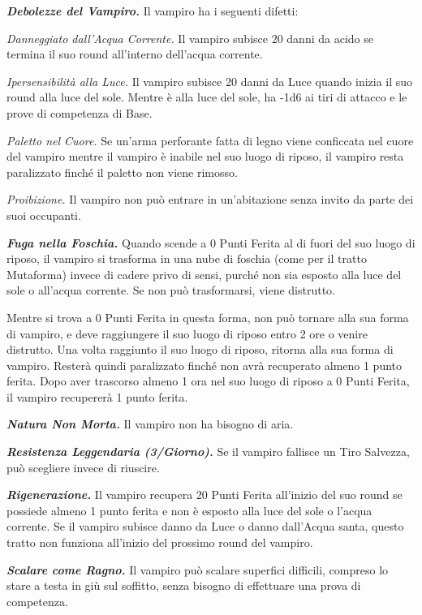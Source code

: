 \begin{multicols}{2}
{\emph{\textbf{Debolezze del Vampiro.}} Il vampiro ha i seguenti difetti:

\emph{Danneggiato dall'Acqua Corrente.} Il vampiro subisce 20 danni da acido se termina il suo round all'interno dell'acqua corrente.

\emph{Ipersensibilità alla Luce.} Il vampiro subisce 20 danni da Luce quando inizia il suo round alla luce del sole. Mentre è alla luce del sole, ha -1d6 ai tiri di attacco e le prove di competenza di Base.

\emph{Paletto nel Cuore.} Se un'arma perforante fatta di legno viene conficcata nel cuore del vampiro mentre il vampiro è inabile nel suo luogo di riposo, il vampiro resta paralizzato finché il paletto non viene rimosso.

\emph{Proibizione.} Il vampiro non può entrare in un'abitazione senza invito da parte dei suoi occupanti.

\emph{\textbf{Fuga nella Foschia.}} Quando scende a 0 Punti Ferita al di fuori del suo luogo di riposo, il vampiro si trasforma in una nube di foschia (come per il tratto Mutaforma) invece di cadere privo di sensi, purché non sia esposto alla luce del sole o all'acqua corrente. Se non può trasformarsi, viene distrutto.

Mentre si trova a 0 Punti Ferita in questa forma, non può tornare alla sua forma di vampiro, e deve raggiungere il suo luogo di riposo entro 2 ore o venire distrutto. Una volta raggiunto il suo luogo di riposo, ritorna alla sua forma di vampiro. Resterà quindi paralizzato finché non avrà recuperato almeno 1 punto ferita. Dopo aver trascorso almeno 1 ora nel suo luogo di riposo a 0 Punti Ferita, il vampiro recupererà 1 punto ferita.

\emph{\textbf{Natura Non Morta.}} Il vampiro non ha bisogno di aria.

\emph{\textbf{Resistenza Leggendaria (3/Giorno).}} Se il vampiro fallisce un Tiro Salvezza, può scegliere invece di riuscire.

\emph{\textbf{Rigenerazione.}} Il vampiro recupera 20 Punti Ferita all'inizio del suo round se possiede almeno 1 punto ferita e non è esposto alla luce del sole o l'acqua corrente. Se il vampiro subisce danno da Luce o danno dall'Acqua santa, questo tratto non funziona all'inizio del prossimo round del vampiro.

\emph{\textbf{Scalare come Ragno.}} Il vampiro può scalare superfici difficili, compreso lo stare a testa in giù sul soffitto, senza bisogno di effettuare una prova di competenza.

}
\end{multicols}
